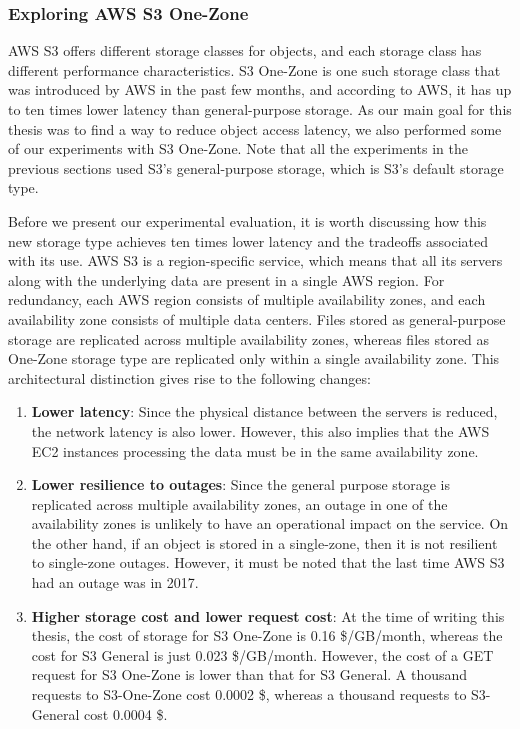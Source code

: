 \subsubsection{Exploring AWS S3 One-Zone}
AWS S3 offers different storage classes for objects, and each storage class has
different performance characteristics. S3 One-Zone is one such storage class
that was introduced by AWS in the past few months, and according to AWS, it has
up to ten times lower latency than general-purpose storage. As our main goal
for this thesis was to find a way to reduce object access latency, we also
performed some of our experiments with S3 One-Zone.
Note that all the experiments
in the previous sections used S3's general-purpose storage, which
is S3's default storage type.

\medskip
Before we present our experimental evaluation, it is worth discussing how this
new storage type achieves ten times lower latency and the tradeoffs
associated with its use. AWS S3 is a region-specific service,
which means that all its servers along with the underlying data are present
in a single AWS region. For redundancy, each AWS region consists of multiple
availability zones, and each availability zone consists of multiple data
centers. Files stored as general-purpose storage are replicated across 
multiple availability zones, whereas files stored as One-Zone storage type are
replicated only within a single availability zone. This architectural
distinction gives rise to the following changes:  
\begin{enumerate}
    \item \textbf{Lower latency}: Since the physical distance between the
        servers is reduced, the network latency is also lower. However, this
        also implies that the AWS EC2 instances processing the data must be
        in the same availability zone.
    \item \textbf{Lower resilience to outages}: Since the general purpose
        storage is replicated across multiple availability zones, an outage in
        one of the availability zones is unlikely to have an operational impact
        on the service. On the other hand, if an object is stored in a single-zone, 
        then it is not resilient to single-zone outages. However, it must
        be noted that the last time AWS S3 had an outage was in 2017.
    \item \textbf{Higher storage cost and lower request cost}: At the time of
        writing this thesis, the cost of
        storage for S3 One-Zone is 0.16 \$/GB/month, whereas the cost for S3
        General is just 0.023 \$/GB/month. However, the cost of a GET request for
        S3 One-Zone is lower than that for S3 General. A thousand requests to
        S3-One-Zone cost 0.0002 \$, whereas a thousand requests to S3-General
        cost 0.0004 \$. 
\end{enumerate}

